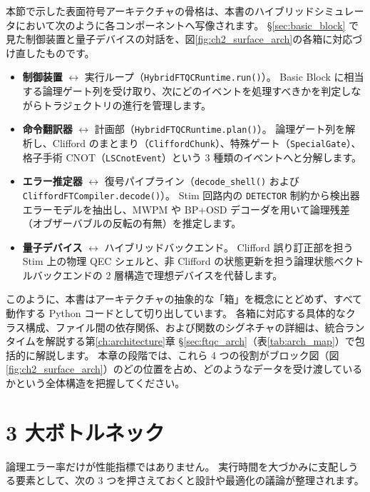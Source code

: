 本節で示した表面符号アーキテクチャの骨格は、本書のハイブリッドシミュレータにおいて次のように各コンポーネントへ写像されます。
§\ref{sec:basic_block} で見た制御装置と量子デバイスの対話を、図\ref{fig:ch2_surface_arch}の各箱に対応づけ直したものです。

\begin{itemize}
  \item \textbf{制御装置} $\leftrightarrow$ 実行ループ（\lstinline{HybridFTQCRuntime.run()}）。
    Basic Block に相当する論理ゲート列を受け取り、次にどのイベントを処理すべきかを判定しながらトラジェクトリの進行を管理します。
  \item \textbf{命令翻訳器} $\leftrightarrow$ 計画部（\lstinline{HybridFTQCRuntime.plan()}）。
    論理ゲート列を解析し、Clifford のまとまり（\lstinline{CliffordChunk}）、特殊ゲート（\lstinline{SpecialGate}）、格子手術 CNOT（\lstinline{LSCnotEvent}）という 3 種類のイベントへと分解します。
  \item \textbf{エラー推定器} $\leftrightarrow$ 復号パイプライン（\lstinline{decode_shell()} および \lstinline{CliffordFTCompiler.decode()}）。
    Stim 回路内の \texttt{DETECTOR} 制約から検出器エラーモデルを抽出し、MWPM や BP+OSD デコーダを用いて論理残差（オブザーバブルの反転の有無）を推定します。
  \item \textbf{量子デバイス} $\leftrightarrow$ ハイブリッドバックエンド。
    Clifford 誤り訂正部を担う Stim 上の物理 QEC シェルと、非 Clifford の状態更新を担う論理状態ベクトルバックエンドの 2 層構造で理想デバイスを代替します。
\end{itemize}

このように、本書はアーキテクチャの抽象的な「箱」を概念にとどめず、すべて動作する Python コードとして切り出しています。
各箱に対応する具体的なクラス構成、ファイル間の依存関係、および関数のシグネチャの詳細は、統合ランタイムを解説する第\ref{ch:architecture}章 §\ref{sec:ftqc_arch}（表\ref{tab:arch_map}）で包括的に解説します。
本章の段階では、これら 4 つの役割がブロック図（図\ref{fig:ch2_surface_arch}）のどの位置を占め、どのようなデータを受け渡しているかという全体構造を把握してください。

\section{3 大ボトルネック}\label{sec:three_bottlenecks}

論理エラー率だけが性能指標ではありません。
実行時間を大づかみに支配しうる要素として、次の 3 つを押さえておくと設計や最適化の議論が整理されます。


